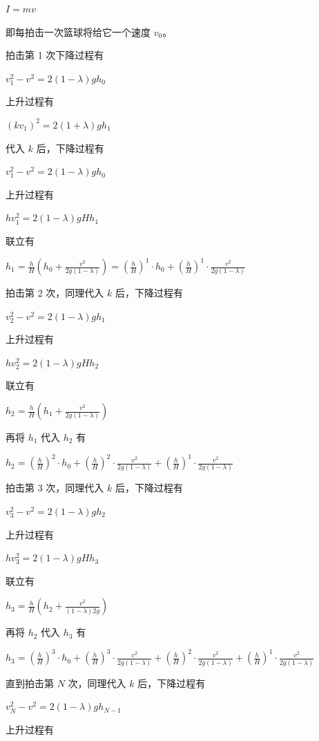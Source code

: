 \documentclass[\gkver]{gaokaozhenti}
\begin{document}
\begin{enumerate}
{$I = mv$

即每拍击一次篮球将给它一个速度 $v_{0}$。

拍击第 1 次下降过程有

$v_{1}^{2} - v^{2} = 2(1 - \lambda)gh_{0}$

上升过程有

$(kv_{1})^{2} = 2(1 + \lambda)gh_{1}$

代入 $k$ 后，下降过程有

$v_{1}^{2} - v^{2} = 2(1 - \lambda)gh_{0}$

上升过程有

$hv_{1}^{2} = 2(1 - \lambda)gHh_{1}$

联立有

$h_{1} = \frac{h}{H}(h_{0} + \frac{v^{2}}{2g(1 - \lambda)}) = (\frac{h}{H})^{1}\cdot h_{0} + (\frac{h}{H})^{1}\cdot\frac{v^{2}}{2g(1 - \lambda)}$

拍击第 2 次，同理代入 $k$ 后，下降过程有

$v_{2}^{2} - v^{2} = 2(1 - \lambda)gh_{1}$

上升过程有

$hv_{2}^{2} = 2(1 - \lambda)gHh_{2}$

联立有

$h_{2} = \frac{h}{H}(h_{1} + \frac{v^{2}}{2g(1 - \lambda)})$

再将 $h_{1}$ 代入 $h_{2}$ 有

$h_{2} = (\frac{h}{H})^{2}\cdot h_{0} + (\frac{h}{H})^{2}\cdot\frac{v^{2}}{2g(1 - \lambda)} + (\frac{h}{H})^{1}\cdot\frac{v^{2}}{2g(1 - \lambda)}$

拍击第 3 次，同理代入 $k$ 后，下降过程有

$v_{3}^{2} - v^{2} = 2(1 - \lambda)gh_{2}$

上升过程有

$hv_{3}^{2} = 2(1 - \lambda)gHh_{3}$

联立有

$h_{3} = \frac{h}{H}(h_{2} + \frac{v^{2}}{(1 - \lambda)2g})$

再将 $h_{2}$ 代入 $h_{3}$ 有

$h_{3} = (\frac{h}{H})^{3}\cdot h_{0} + (\frac{h}{H})^{3}\cdot\frac{v^{2}}{2g(1 - \lambda)} + (\frac{h}{H})^{2}\cdot\frac{v^{2}}{2g(1 - \lambda)} + (\frac{h}{H})^{1}\cdot\frac{v^{2}}{2g(1 - \lambda)}$

直到拍击第 $N$ 次，同理代入 $k$ 后，下降过程有

$v_{N}^{2} - v^{2} = 2(1 - \lambda)gh_{N-1}$

上升过程有

}
\end{enumerate}
\end{document}
